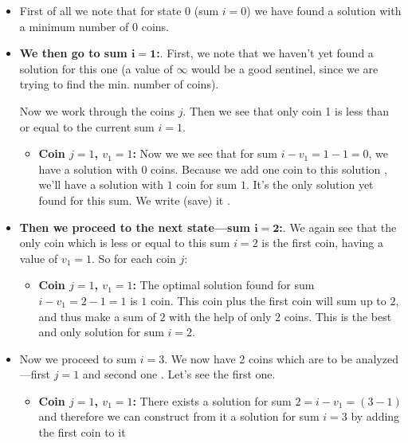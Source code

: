 \begin{itemize}%
\item First of all we note that for state 0 (sum $i=0$) we have found a
  solution with a minimum number of 0 coins.
\item \textbf{We then go to sum $\bm{i=1}$:}. First, we note that we haven't
  yet found a solution for this one (a value of $\infty$ would be a good
  sentinel, since we are trying to find the min. number of coins). 

  Now we work through the coins $j$. Then we see that only coin 1 is less
  than or equal to the current sum $i=1$.

  \begin{itemize}%
  \item \textbf{Coin $j=1$, $v_1=1$:} Now we we see that for sum
    $i-v_1=1-1=0$, we have a solution with $0$ coins. Because we add one
    coin to this solution , we'll have a solution with $1$ coin for sum $1$. It's the only
    solution yet found for this sum.  We write (save) it .
  \end{itemize}
\item \textbf{Then we proceed to the next state---sum $\bm{i=2}$:}. We 
  again see that the only
  coin which is less or equal to this sum $i=2$ is the first coin, having a 
  value of $v_1 = 1$. So for each coin $j$:
  \begin{itemize}%
  \item \textbf{Coin $j=1$, $v_1=1$:} The optimal solution found for sum
    $i-v_1=2-1=1$ is $1$ coin. This coin plus the first coin  will sum up to $2$, and thus make a sum of
    $2$ with the help of only $2$ coins. This is the best and only solution
    for sum $i=2$.
  \end{itemize}
\item Now we proceed to sum $i=3$. We now have 2 coins which are to be
  analyzed---first $j=1$  and second one
  . Let's see the first one.
  \begin{itemize}%
  \item \textbf{Coin $j=1$, $v_1=1$:} There exists a solution for sum
    $2=i-v_1=(3-1)$ and therefore we can construct from it a solution for
    sum $i=3$ by adding the first coin  to it

\end{itemize}
\end{itemize}
